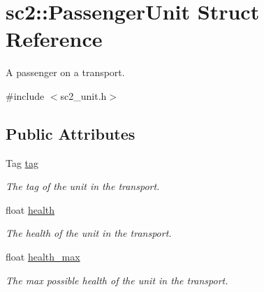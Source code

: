 \hypertarget{structsc2_1_1_passenger_unit}{}\section{sc2\+:\+:Passenger\+Unit Struct Reference}
\label{structsc2_1_1_passenger_unit}


A passenger on a transport.  




{\ttfamily \#include $<$sc2\+\_\+unit.\+h$>$}

\subsection*{Public Attributes}
\begin{DoxyCompactItemize}
\item 
\mbox{\label{structsc2_1_1_passenger_unit_ab0fc9d12eb58790d3668876f48becb02}} 
Tag \hyperlink{structsc2_1_1_passenger_unit_ab0fc9d12eb58790d3668876f48becb02}{tag}
\begin{DoxyCompactList}\small\item\em The tag of the unit in the transport. \end{DoxyCompactList}\item 
\mbox{\label{structsc2_1_1_passenger_unit_a41fe19bef8810ba5c7e18d4ab3d05cd4}} 
float \hyperlink{structsc2_1_1_passenger_unit_a41fe19bef8810ba5c7e18d4ab3d05cd4}{health}
\begin{DoxyCompactList}\small\item\em The health of the unit in the transport. \end{DoxyCompactList}\item 
\mbox{\label{structsc2_1_1_passenger_unit_afdb24a4e42c3a981713aa311cc319ed4}} 
float \hyperlink{structsc2_1_1_passenger_unit_afdb24a4e42c3a981713aa311cc319ed4}{health\+\_\+max}
\begin{DoxyCompactList}\small\item\em The max possible health of the unit in the transport. \end{DoxyCompactList}\item 
\mbox{\label{structsc2_1_1_passenger_unit_a8e79587e7907106cde23a76e2db4d1fd}} 

\end{DoxyCompactItemize}
